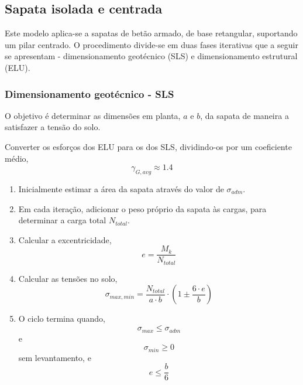 \subsection{Sapata isolada e centrada}
Este modelo aplica-se a sapatas de betão armado, de base retangular, suportando um pilar centrado. O procedimento divide-se em duas fases iterativas que a seguir se apresentam - dimensionamento geotécnico (SLS) e dimensionamento estrutural (ELU).

\subsubsection{Dimensionamento geotécnico - SLS}
O objetivo é determinar as dimensões em planta, $a$ e $b$, da sapata de maneira a satisfazer a tensão do solo.

Converter os esforços dos ELU para os dos SLS, dividindo-os por um coeficiente médio, 
\begin{equation}
    \gamma_{G,avg} \approx 1.4
\end{equation}

\begin{enumerate}
    \item Inicialmente estimar a área da sapata através do valor de $\sigma_{adm}$.
    \item Em cada iteração, adicionar o peso próprio da sapata às cargas, para determinar a carga total $N_{total}$.
    \item Calcular a excentricidade,
    \begin{equation}
        e = \frac{M_k}{N_{total}}
    \end{equation}
    \item Calcular as tensões no solo,
    \begin{equation}
        \sigma_{max,min} = \frac{N_{total}}{a \cdot b} \cdot \left(1 \pm \frac{6 \cdot e}{b}\right)
    \end{equation}
    \item O ciclo termina quando,
    \begin{equation}
        \sigma_{max} \le \sigma_{adm}
    \end{equation}
    e
    \begin{equation}
        \sigma_{min} \ge 0
    \end{equation}
    sem levantamento, e
    \begin{equation}
        e \le \frac{b}{6}
    \end{equation}
\end{enumerate}

